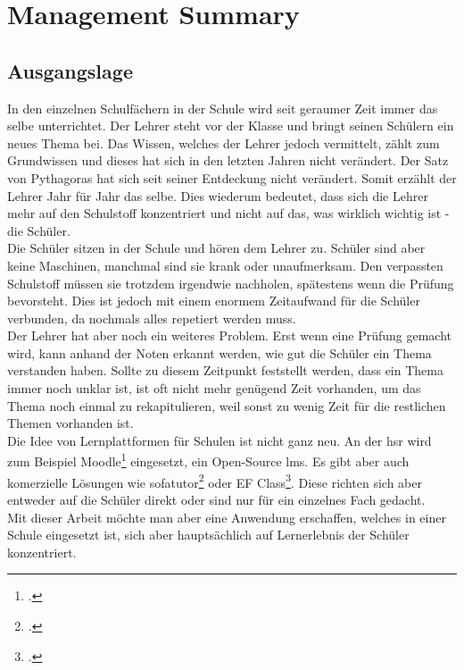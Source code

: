 \section*{Management Summary}

\subsection*{Ausgangslage}
In den einzelnen Schulfächern in der Schule wird seit geraumer Zeit immer das selbe unterrichtet. Der Lehrer steht vor der Klasse und bringt seinen Schülern ein neues Thema bei. Das Wissen, welches der Lehrer jedoch vermittelt, zählt zum Grundwissen und dieses hat sich in den letzten Jahren nicht verändert. Der Satz von Pythagoras hat sich seit seiner Entdeckung nicht verändert. Somit erzählt der Lehrer Jahr für Jahr das selbe. Dies wiederum bedeutet, dass sich die Lehrer mehr auf den Schulstoff konzentriert und nicht auf das, was wirklich wichtig ist - die Schüler. \\

Die Schüler sitzen in der Schule und hören dem Lehrer zu. Schüler sind aber keine Maschinen, manchmal sind sie krank oder unaufmerksam. Den verpassten Schulstoff müssen sie trotzdem irgendwie nachholen, spätestens wenn die Prüfung bevorsteht. Dies ist jedoch mit einem enormem Zeitaufwand für die Schüler verbunden, da nochmals alles repetiert werden muss. \\

Der Lehrer hat aber noch ein weiteres Problem. Erst wenn eine Prüfung gemacht wird, kann anhand der Noten erkannt werden, wie gut die Schüler ein Thema verstanden haben. Sollte zu diesem Zeitpunkt feststellt werden, dass ein Thema immer noch unklar ist, ist oft nicht mehr genügend Zeit vorhanden, um das Thema noch einmal zu rekapitulieren, weil sonst zu wenig Zeit für die restlichen Themen vorhanden ist. \\

Die Idee von Lernplattformen für Schulen ist nicht ganz neu. An der \gls{hsr} wird zum Beispiel Moodle\footcite{moodle_homepage} eingesetzt, ein Open-Source \gls{lms}. Es gibt aber auch komerzielle Lösungen wie sofatutor\footcite{sofatutor_homepage} oder EF Class\footcite{ef_class_homepage}. Diese richten sich aber entweder auf die Schüler direkt oder sind nur für ein einzelnes Fach gedacht. \\

Mit dieser Arbeit möchte man aber eine Anwendung erschaffen, welches in einer Schule eingesetzt ist, sich aber hauptsächlich auf Lernerlebnis der Schüler konzentriert. 


